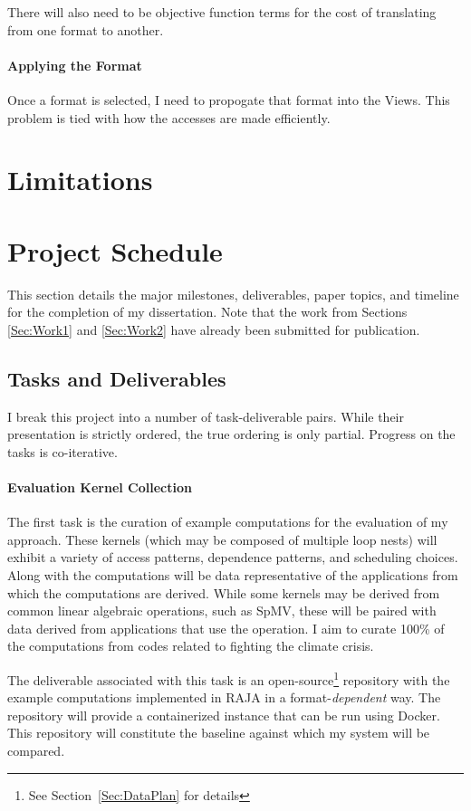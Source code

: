 \documentclass{article}
\begin{document}
There will also need to be objective function terms for the cost of translating from one format to another. 

\paragraph{Applying the Format}
Once a format is selected, I need to propogate that format into the Views. 
This problem is tied with how the accesses are made efficiently. 

\section{Limitations}

\section{Project Schedule}
This section details the major milestones, deliverables, paper topics, and timeline for the completion of my dissertation. Note that the work from Sections \ref{Sec:Work1} and \ref{Sec:Work2} have already been submitted for publication.

\subsection{Tasks and Deliverables}

I break this project into a number of task-deliverable pairs.
While their presentation is strictly ordered, the true ordering is only partial. Progress on the tasks is co-iterative.

\paragraph{Evaluation Kernel Collection}
The first task is the curation of example computations for the evaluation of my approach. 
These kernels (which may be composed of multiple loop nests) will exhibit a variety of access patterns, dependence patterns, and scheduling choices. 
Along with the computations will be data representative of the applications from which the computations are derived. 
While some kernels may be derived from common linear algebraic operations, such as SpMV, these will be paired with data derived from applications that use the operation.
I aim to curate 100\% of the computations from codes related to fighting the climate crisis.

The deliverable associated  with this task is an open-source\footnote{See Section~\ref{Sec:DataPlan} for details} repository with the example computations implemented in RAJA in a format-\textit{dependent} way. 
The repository will provide a containerized instance that can be run using Docker.
This repository will constitute the baseline against which my system will be compared.
\end{document}
